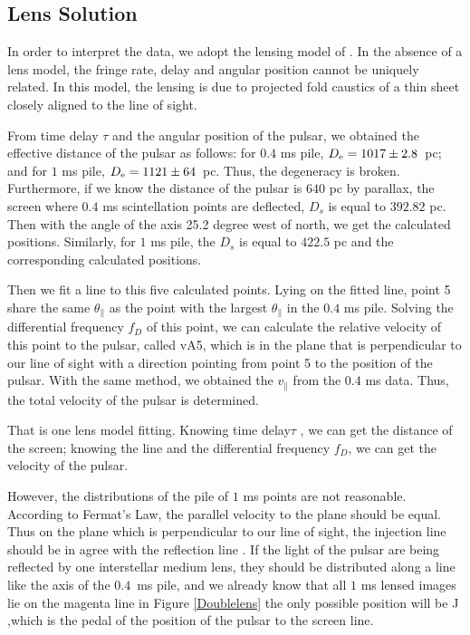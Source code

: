 \documentclass[useAMS,usenatbib]{mn2e}
\begin{document}
\subsection{Lens Solution}

In order to interpret the data, we adopt the lensing model of
\citet{2014MNRAS.442.3338P}.  In the absence of a lens model, the
fringe rate, delay and angular position cannot be uniquely related. In
this model, the lensing is due to projected fold caustics of a thin
sheet closely aligned to the line of sight.

From time delay $\tau$ and the angular position of the pulsar, we obtained the effective distance of the pulsar as follows: 
for $0.4$ ms pile, $D_{\rm e}=1017\pm2.8$\ pc; 
and for $1$ ms pile, $D_{\rm e}=1121\pm64$\ pc.
Thus, the degeneracy is broken. Furthermore, if we know the distance of the pulsar is $640$ pc by parallax,
the screen where $0.4$ ms scintellation points are deflected, $D_s$ is equal to $392.82$ pc. Then with the angle of the axis 25.2 degree west of north, we get the calculated positions.
Similarly, for $1$ ms pile, the $D_s$ is equal to $422.5$ pc and the corresponding calculated positions.

Then we fit a line to this five calculated points. Lying on the fitted line, point 5 share the same $\theta_{\parallel}$ as the point with the largest $\theta_{\parallel}$ in the $0.4$ ms pile. Solving the differential frequency ${f_D}$ of this point, we can calculate the relative velocity of this point to the pulsar, called vA5, which is in the plane that is perpendicular to our line of sight with a direction pointing from point 5 to the position of the pulsar. With the same method, we obtained the $v_{\parallel}$ from the $0.4$ ms data. Thus, the total velocity of the pulsar is determined.

That is one lens model fitting. Knowing time delay${\tau}$ , we can get the distance of the screen; knowing the line and the differential frequency ${f_D}$, we can get the velocity of the pulsar.

However, the distributions of the pile of $1$ ms points are not reasonable. According to Fermat's Law, the parallel velocity to the plane should be equal. Thus on the plane which is perpendicular to our line of sight, the injection line should be in agree with the reflection line . If the light of the pulsar are being reflected by one interstellar medium lens, they should be distributed along a line like the axis of the $0.4$\ ms pile, and we already know that all $1$ ms lensed images lie on the magenta line in Figure \ref{Doublelens} the only possible position will be J ,which is the pedal of the position of the pulsar to the screen line. 
\end{document}
